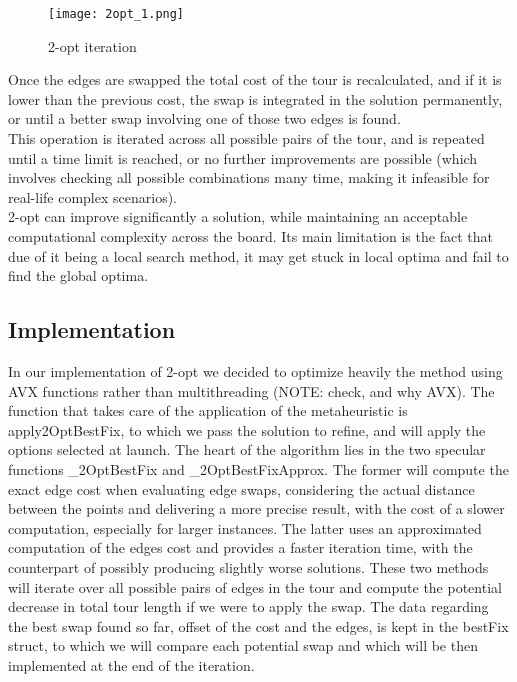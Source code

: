 \begin{figure}
    \centering
    \texttt{[image: 2opt\_1.png]}
    \caption{2-opt iteration}
    \label{fig:2-opt}
\end{figure}

Once the edges are swapped the total cost of the tour is recalculated, and if it is lower than the previous cost, the swap is 
integrated in the solution permanently, or until a better swap involving one of those two edges is found.\\
This operation is iterated across all possible pairs of the tour, and is repeated until a time limit is reached, or 
no further improvements are possible (which involves checking all possible combinations many time, making it infeasible for 
real-life complex scenarios).\\
2-opt can improve significantly a solution, while maintaining an acceptable computational complexity across the board. Its
main limitation is the fact that due of it being a local search method, it may get stuck in local optima and fail to find the
global optima.

\subsection{Implementation}
In our implementation of 2-opt we decided to optimize heavily the method using AVX functions rather than multithreading 
(NOTE: check, and why AVX).
The function that takes care of the application of the metaheuristic is apply2OptBestFix, to which we pass the solution to refine, 
and will apply the options selected at launch. 
The heart of the algorithm lies in the two specular functions _2OptBestFix and _2OptBestFixApprox.
The former will compute the exact edge cost when evaluating edge swaps, considering the actual distance between the points and delivering 
a more precise result, with the cost of a slower computation, especially for larger instances.
The latter uses an approximated computation of the edges cost and provides a faster iteration time, with the counterpart of possibly 
producing slightly worse solutions. 
These two methods will iterate over all possible pairs of edges in the tour and compute the potential decrease in total tour length if 
we were to apply the swap.
The data regarding the best swap found so far, offset of the cost and the edges, is kept in the bestFix struct, to which we will compare 
each potential swap and which will be then implemented at the end of the iteration.


